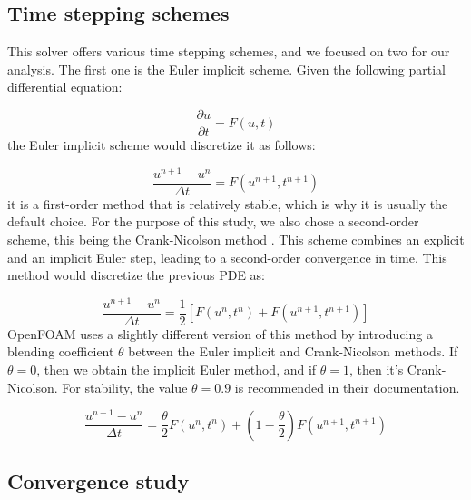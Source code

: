\documentclass[
  english,        %
  font=times,     %
  onecolumn,      %
]{tumarticle}
\begin{document}
\subsection{Time stepping schemes}\label{sec:euler}
This solver offers various time stepping schemes, and we focused on two for our analysis. The first one is the Euler implicit scheme. Given the following partial differential equation:

\begin{equation}
    \frac{\partial u}{\partial t} = F(u, t)
\end{equation}
the Euler implicit scheme would discretize it as follows:

\begin{equation}
    \frac{u^{n+1} - u^n}{\Delta t} = {F}(u^{n+1}, t^{n+1})
\end{equation}
it is a first-order method that is relatively stable, which is why it is usually the default choice. For the purpose of this study, we also chose a second-order scheme, this being the Crank-Nicolson method \cite{crank1947practical}. This scheme combines an explicit and an implicit Euler step, leading to a second-order convergence in time. This method would discretize the previous PDE as: 

\begin{equation}
    \frac{u^{n+1} - u^n}{\Delta t} = \frac{1}{2} \left[F(u^n, t^n) +  F(u^{n+1}, t^{n+1}) \right]
\end{equation}
OpenFOAM uses a slightly different version of this method by introducing a blending coefficient $\theta$ between the Euler implicit and Crank-Nicolson methods. If $\theta = 0$, then we obtain the implicit Euler method, and if $\theta = 1$, then it's Crank-Nicolson. For stability, the value $\theta = 0.9$ is recommended in their documentation.

\begin{equation}
    \frac{u^{n+1} - u^n}{\Delta t} = \frac{\theta}{2} F(u^{n}, t^{n}) + \left( 1 - \frac{\theta}{2} \right) F(u^{n+1}, t^{n+1})
\end{equation}


\subsection{Convergence study}
\end{document}
